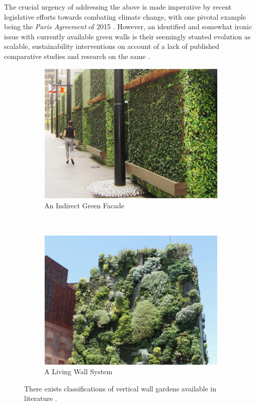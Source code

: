 \documentclass{report}
\begin{document}
The crucial urgency of addressing the above is made imperative by recent legislative efforts towards combating climate change, with one pivotal example being the \textit{Paris Agreement} of 2015 \cite{UNFCCC2015}. However, an identified and somewhat ironic issue with currently available green walls is their seemingly stunted evolution as scalable, sustainability interventions on account of a lack of published comparative studies and research on the same \cite{Manso2015} \cite{Kalantari2017}.

\begin{figure}[h]
	\begin{subfigure}[b]{0.5\textwidth}
		\centering
		\includegraphics[width=\textwidth]{images/IndirectGreenFacade.png}
		\caption{An Indirect Green Facade \cite{Manso2015}}
		\label{fig:vertical_farm}
	\end{subfigure}
	~
	\begin{subfigure}[b]{0.505\textwidth}
		\centering
		\includegraphics[width=\textwidth]{images/LivingWallSystem}
		\caption{A Living Wall System \cite{Manso2015}}
		\label{fig:vertical_garden}
	\end{subfigure}
	\caption{There exists classifications of vertical wall gardens available in literature \cite{Manso2015}.}
	\label{fig:vertical_applications}
\end{figure}
\end{document}
